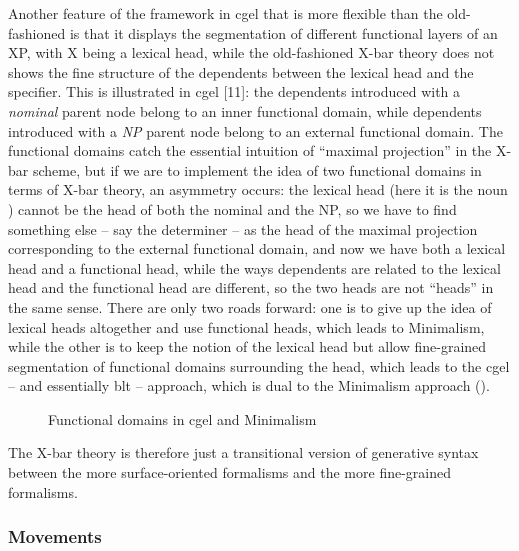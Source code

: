 \documentclass[../main.tex]{subfiles}
\begin{document}
Another feature of the framework in \ac{cgel} that is more flexible than the old-fashioned
is that it displays the segmentation of different functional layers of an XP,
with X being a lexical head, 
while the old-fashioned X-bar theory does not shows the fine structure of the dependents 
between the lexical head and the specifier.
This is illustrated in \ac{cgel}  [11]:
the dependents introduced with a \emph{nominal} parent node 
belong to an inner functional domain, 
while dependents introduced with a \emph{NP} parent node 
belong to an external functional domain.
The functional domains catch the essential intuition of ``maximal projection'' in the X-bar scheme,
but if we are to implement the idea of two functional domains in terms of X-bar theory,
an asymmetry occurs: 
the lexical head (here it is the noun ) cannot be the head of both the nominal and the NP,
so we have to find something else -- say the determiner -- as the head of the maximal projection 
corresponding to the external functional domain, and now we have both a lexical head and a functional head,
while the ways dependents are related to the lexical head and the functional head are different,
so the two heads are not ``heads'' in the same sense.
There are only two roads forward: 
one is to give up the idea of lexical heads altogether and use functional heads,
which leads to Minimalism,
while the other is to keep the notion of the lexical head 
but allow fine-grained segmentation of functional domains surrounding the head,
which leads to the \ac{cgel} -- and essentially \ac{blt} -- approach,
which is dual to the Minimalism approach ().

\begin{figure}
    \centering
    
    \caption{Functional domains in \ac{cgel} and Minimalism}
    \label{fig:cgel-minimalism-dual}
\end{figure}

The X-bar theory is therefore just a transitional version of generative syntax 
between the more surface-oriented formalisms 
and the more fine-grained formalisms.

\subsubsection{Movements}\label{sec:movement-in-theory}
\end{document}
